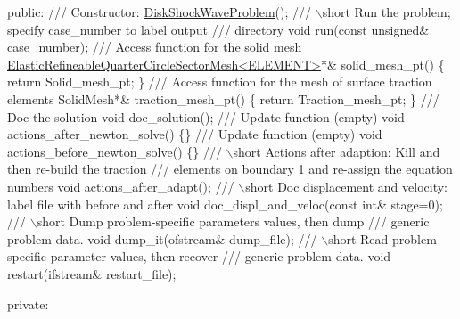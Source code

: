 \begin{DoxyCodeInclude}
\textcolor{keyword}{public}:
\textcolor{comment}{}
\textcolor{comment}{ /// Constructor:}
\textcolor{comment}{} \hyperlink{classDiskShockWaveProblem}{DiskShockWaveProblem}();
\textcolor{comment}{}
\textcolor{comment}{ /// \(\backslash\)short Run the problem; specify case\_number to label output}
\textcolor{comment}{ /// directory}
\textcolor{comment}{} \textcolor{keywordtype}{void} run(\textcolor{keyword}{const} \textcolor{keywordtype}{unsigned}& case\_number);
 \textcolor{comment}{}
\textcolor{comment}{ /// Access function for the solid mesh}
\textcolor{comment}{} \hyperlink{classElasticRefineableQuarterCircleSectorMesh}{ElasticRefineableQuarterCircleSectorMesh<ELEMENT>}*& 
      solid\_mesh\_pt() 
  \{
   \textcolor{keywordflow}{return} Solid\_mesh\_pt;  
  \} 
\textcolor{comment}{}
\textcolor{comment}{ /// Access function for the mesh of surface traction elements}
\textcolor{comment}{} SolidMesh*& traction\_mesh\_pt() 
  \{
   \textcolor{keywordflow}{return} Traction\_mesh\_pt;  
  \} 
\textcolor{comment}{}
\textcolor{comment}{ /// Doc the solution}
\textcolor{comment}{} \textcolor{keywordtype}{void} doc\_solution();
\textcolor{comment}{}
\textcolor{comment}{ /// Update function (empty)}
\textcolor{comment}{} \textcolor{keywordtype}{void} actions\_after\_newton\_solve() \{\}
\textcolor{comment}{}
\textcolor{comment}{ /// Update function (empty)}
\textcolor{comment}{} \textcolor{keywordtype}{void} actions\_before\_newton\_solve() \{\}
\textcolor{comment}{}
\textcolor{comment}{ /// \(\backslash\)short Actions after adaption: Kill and then re-build the traction }
\textcolor{comment}{ /// elements on boundary 1 and re-assign the equation numbers}
\textcolor{comment}{} \textcolor{keywordtype}{void} actions\_after\_adapt();
\textcolor{comment}{}
\textcolor{comment}{ /// \(\backslash\)short Doc displacement and velocity: label file with before and after}
\textcolor{comment}{} \textcolor{keywordtype}{void} doc\_displ\_and\_veloc(\textcolor{keyword}{const} \textcolor{keywordtype}{int}& stage=0);
\textcolor{comment}{}
\textcolor{comment}{ /// \(\backslash\)short Dump problem-specific parameters values, then dump}
\textcolor{comment}{ /// generic problem data.}
\textcolor{comment}{} \textcolor{keywordtype}{void} dump\_it(ofstream& dump\_file);
\textcolor{comment}{}
\textcolor{comment}{ /// \(\backslash\)short Read problem-specific parameter values, then recover}
\textcolor{comment}{ /// generic problem data.}
\textcolor{comment}{} \textcolor{keywordtype}{void} restart(ifstream& restart\_file);

\textcolor{keyword}{private}:


\end{DoxyCodeInclude}
